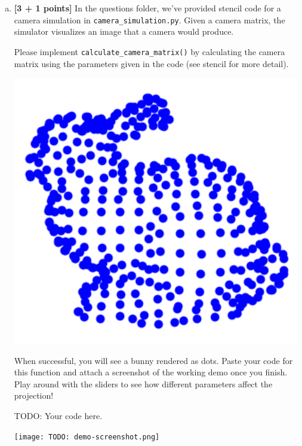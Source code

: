 \begin{enumerate}[(a)]








\item \textbf{[3 + 1 points]}
In the questions folder, we've provided stencil code for a camera simulation in \texttt{camera\_simulation.py}. Given a camera matrix, the simulator visualizes an image that a camera would produce. 

Please implement \texttt{calculate\_camera\_matrix()} by calculating the camera matrix using the parameters given in the code (see stencil for more detail). 

\includegraphics[width=0.5\linewidth]{images/bunny.png}

When successful, you will see a bunny rendered as dots. Paste your code for this function and attach a screenshot of the working demo once you finish. Play around with the sliders to see how different parameters affect the projection!

\begin{python}
TODO: Your code here.
\end{python}

\texttt{[image: TODO: demo-screenshot.png]}


\end{enumerate}

